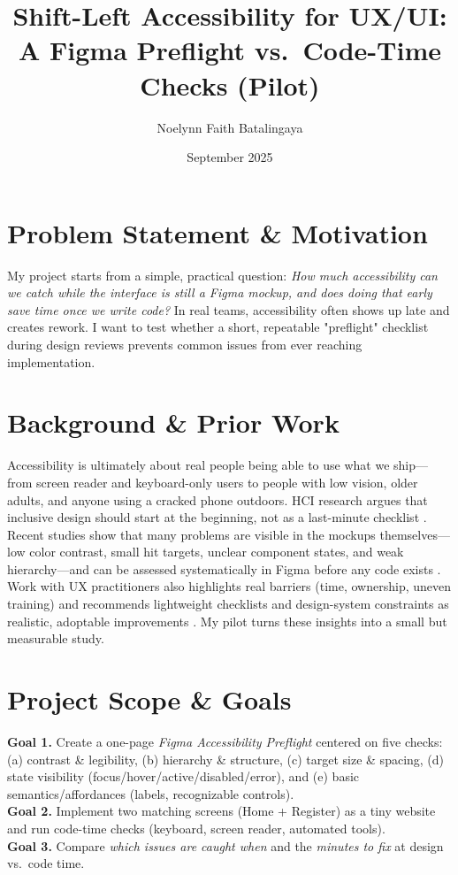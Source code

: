 \documentclass[12pt]{article}
\title{\textbf{Shift-Left Accessibility for UX/UI: A Figma Preflight vs.\ Code-Time Checks (Pilot)}}
\author{Noelynn Faith Batalingaya}
\date{September 2025}
\begin{document}
\maketitle

\section*{Problem Statement \& Motivation}
My project starts from a simple, practical question: \emph{How much accessibility can we catch while the interface is still a Figma mockup, and does doing that early save time once we write code?} In real teams, accessibility often shows up late and creates rework. I want to test whether a short, repeatable "preflight" checklist during design reviews prevents common issues from ever reaching implementation.

\section*{Background \& Prior Work}
Accessibility is ultimately about real people being able to use what we ship—from screen reader and keyboard-only users to people with low vision, older adults, and anyone using a cracked phone outdoors. HCI research argues that inclusive design should start at the beginning, not as a last-minute checklist \cite{bennett2018inclusive}. Recent studies show that many problems are visible in the mockups themselves—low color contrast, small hit targets, unclear component states, and weak hierarchy—and can be assessed systematically in Figma before any code exists \cite{huang2024a11yfigma, chen2024figmaapps}. Work with UX practitioners also highlights real barriers (time, ownership, uneven training) and recommends lightweight checklists and design-system constraints as realistic, adoptable improvements \cite{shi2023uxaccesspractice}. My pilot turns these insights into a small but measurable study.

\section*{Project Scope \& Goals}
\textbf{Goal 1.} Create a one-page \emph{Figma Accessibility Preflight} centered on five checks: (a) contrast \& legibility, (b) hierarchy \& structure, (c) target size \& spacing, (d) state visibility (focus/hover/active/disabled/error), and (e) basic semantics/affordances (labels, recognizable controls).\\
\textbf{Goal 2.} Implement two matching screens (Home + Register) as a tiny website and run code-time checks (keyboard, screen reader, automated tools).\\
\textbf{Goal 3.} Compare \emph{which issues are caught when} and the \emph{minutes to fix} at design vs.\ code time.
\end{document}
